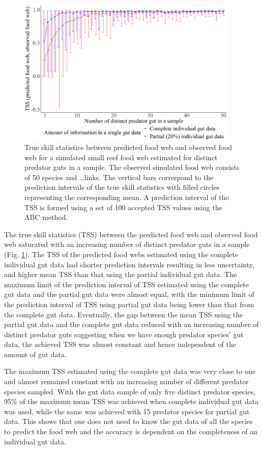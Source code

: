 \documentclass{article}
\begin{document}
\begin{figure}

{\centering \includegraphics[width=400px]{../fig/TSS_with_n_pred_prop_simulated} 

}

\caption{\label{fig:fig_r0} True skill statistics between predicted food web and observed food web for a simulated small reef food web estimated for distinct predator guts in a sample. The observed simulated food web consists of 50 species and \dots links. The vertical bars correspond to the prediction intervals of the true skill statistics with filled circles representing the corresponding mean. A prediction interval of the TSS is formed using a set of 100 accepted TSS values using the ABC method.}\label{fig:fig_r0}
\end{figure}

The true skill statistics (TSS) between the predicted food web and
observed food web saturated with an increasing number of distinct
predator guts in a sample (Fig. \ref{fig:fig_r0}). The TSS of the
predicted food webs estimated using the complete individual gut data had
shorter prediction intervals resulting in less uncertainty, and higher
mean TSS than that using the partial individual gut data. The maximum
limit of the prediction interval of TSS estimated using the complete gut
data and the partial gut data were almost equal, with the minimum limit
of the prediction interval of TSS using partial gut data being lower
than that from the complete gut data. Eventually, the gap between the
mean TSS using the partial gut data and the complete gut data reduced
with an increasing number of distinct predator guts suggesting when we
have enough predator species' gut data, the achieved TSS was almost
constant and hence independent of the amount of gut data.

The maximum TSS estimated using the complete gut data was very close to
one and almost remained constant with an increasing number of different
predator species sampled. With the gut data sample of only five distinct
predator species, 95\% of the maximum mean TSS was achieved when
complete individual gut data was used, while the same was achieved with
15 predator species for partial gut data. This shows that one does not
need to know the gut data of all the species to predict the food web and
the accuracy is dependent on the completeness of an individual gut data.
\end{document}
